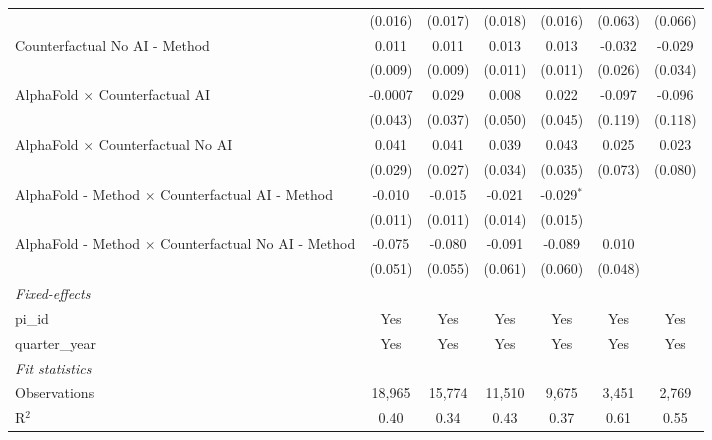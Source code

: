 \begin{tabular}{lcccccc}
                                                              & (0.016) & (0.017) & (0.018) & (0.016)      & (0.063) & (0.066)\\   
   Counterfactual No AI - Method                              & 0.011   & 0.011   & 0.013   & 0.013        & -0.032  & -0.029\\   
                                                              & (0.009) & (0.009) & (0.011) & (0.011)      & (0.026) & (0.034)\\   
   AlphaFold $\times$ Counterfactual AI                       & -0.0007 & 0.029   & 0.008   & 0.022        & -0.097  & -0.096\\   
                                                              & (0.043) & (0.037) & (0.050) & (0.045)      & (0.119) & (0.118)\\   
   AlphaFold $\times$ Counterfactual No AI                    & 0.041   & 0.041   & 0.039   & 0.043        & 0.025   & 0.023\\   
                                                              & (0.029) & (0.027) & (0.034) & (0.035)      & (0.073) & (0.080)\\   
   AlphaFold - Method $\times$ Counterfactual AI - Method     & -0.010  & -0.015  & -0.021  & -0.029$^{*}$ &         &   \\   
                                                              & (0.011) & (0.011) & (0.014) & (0.015)      &         &   \\   
   AlphaFold - Method $\times$ Counterfactual No AI - Method  & -0.075  & -0.080  & -0.091  & -0.089       & 0.010   &   \\   
                                                              & (0.051) & (0.055) & (0.061) & (0.060)      & (0.048) &   \\   
   \midrule
   \emph{Fixed-effects}\\
   pi\_id                                                     & Yes     & Yes     & Yes     & Yes          & Yes     & Yes\\  
   quarter\_year                                              & Yes     & Yes     & Yes     & Yes          & Yes     & Yes\\  
   \midrule
   \emph{Fit statistics}\\
   Observations                                               & 18,965  & 15,774  & 11,510  & 9,675        & 3,451   & 2,769\\  
   R$^2$                                                      & 0.40    & 0.34    & 0.43    & 0.37         & 0.61    & 0.55\\  

\end{tabular}
